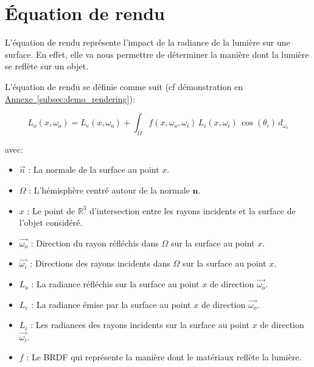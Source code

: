 \section{Équation de rendu}

L'équation de rendu représente l'impact de la radiance de la lumière sur une surface. En effet, elle va nous permettre de déterminer la manière dont la lumière se reflète sur un objet.

\begin{figure}[H]
	\bounce
	\centering 
\end{figure}

L'équation de rendu se définie comme suit (cf démonstration en \hyperref[subsec:demo_rendering]{Annexe~\ref*{subsec:demo_rendering}}):

$$\boxed{L_{o}(x, \omega_o) = L_{e}(x, \omega_o) + \int_{\Omega}f(x, \omega_o, \omega_i) \, L_{i}(x, \omega_i) \, \cos\left(\theta_i\right) \, d_{\omega_i}}$$

avec: 
\begin{itemize}
\item[$\_$] $\overrightarrow{n}$ : La normale de la surface au point $x$.
\item[$\_$] $\Omega$ : L'hémisphère centré autour de la normale $\textbf{n}$.
\item[$\_$] $x$ : Le point de $\mathbb{R}^3$ d'intersection entre les rayons incidents et la surface de l'objet considéré.
\item[$\_$] $\overrightarrow{\omega_o}$ : Direction du rayon réfléchis dans $\Omega$ sur la surface au point $x$.
\item[$\_$] $\overrightarrow{\omega_i}$ : Directions des rayons incidents dans $\Omega$ sur la surface au point $x$.
\item[$\_$] $L_o$ : La radiance réfléchis sur la surface au point $x$ de direction $\overrightarrow{\omega_o}$.
\item[$\_$] $L_e$ : La radiance émise par la surface au point $x$ de direction $\overrightarrow{\omega_o}$.
\item[$\_$] $L_i$ : Les radiances des rayons incidents sur la surface au point $x$ de direction $\overrightarrow{\omega_i}$.
\item[$\_$] $f$ : Le BRDF qui représente la manière dont le matériaux reflète la lumière.
\end{itemize}

